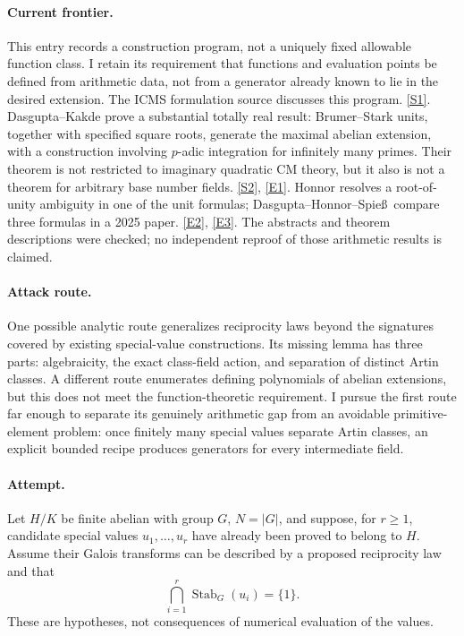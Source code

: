 \documentclass[11pt,a4paper]{article}
\newcommand{\sref}[2]{\hyperlink{source:#1:#2}{[S#2]}}
\newcommand{\eref}[2]{\hyperlink{extra:#1:#2}{[E#2]}}
\numberwithin{equation}{section}
\begin{document}
\paragraph{Current frontier.}
This entry records a construction program, not a uniquely fixed allowable
function class. I retain its requirement that functions and evaluation points
be defined from arithmetic data, not from a generator already known to lie in
the desired extension. The ICMS formulation source discusses this program.
\sref{45}{1}. Dasgupta--Kakde prove a substantial totally real result:
Brumer--Stark units, together with specified square roots, generate the maximal
abelian extension, with a construction involving $p$-adic integration for
infinitely many primes. Their theorem is not restricted to imaginary quadratic
CM theory, but it also is not a theorem for arbitrary base number fields.
\sref{45}{2}, \eref{45}{1}. Honnor resolves a root-of-unity ambiguity in one
of the unit formulas; Dasgupta--Honnor--Spie\ss\ compare three formulas in a
2025 paper. \eref{45}{2}, \eref{45}{3}. The abstracts and theorem descriptions
were checked; no independent reproof of those arithmetic results is claimed.

\paragraph{Attack route.}
One possible analytic route generalizes reciprocity laws beyond the signatures
covered by existing special-value constructions. Its missing lemma has three
parts: algebraicity, the exact class-field action, and separation of distinct
Artin classes. A different route enumerates defining polynomials of abelian
extensions, but this does not meet the function-theoretic requirement. I
pursue the first route far enough to separate its genuinely arithmetic gap
from an avoidable primitive-element problem: once finitely many special
values separate Artin classes, an explicit bounded recipe produces generators
for every intermediate field.

\paragraph{Attempt.}
Let $H/K$ be finite abelian with group $G$, $N=|G|$, and suppose, for $r\ge1$, candidate
special values $u_1,\ldots,u_r$ have already been proved to belong to $H$.
Assume their Galois transforms can be described by a proposed reciprocity law
and that
\begin{equation}\label{r36:separation}
 \bigcap_{i=1}^r\operatorname{Stab}_G(u_i)=\{1\}.
\end{equation}
These are hypotheses, not consequences of numerical evaluation of the values.
\end{document}
